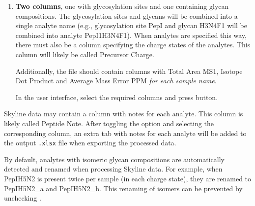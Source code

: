 \begin{enumerate}[topsep=0pt, itemsep=0pt]
	\item 
	\textbf{Two columns}, one with glycosylation sites and one containing glycan compositions.
	The glycosylation sites and glycans will be combined into a single analyte name (e.g., glycosylation site \textsf{PepI} and glycan \textsf{H3N4F1} will be combined into analyte \textsf{PepI1H3N4F1}).
	When analytes are specified this way, there must also be a column specifying the charge states of the analytes.
	This column will likely be called \textsf{Precursor Charge}.
	
	Additionally, the file should contain columns with \textsf{Total Area MS1}, \textsf{Isotope Dot Product} and \textsf{Average Mass Error PPM} \emph{for each sample name}.
	
	In the user interface, select the required columns and press  button.
		
\end{enumerate}


\begin{optionalbox}
	Skyline data may contain a column with notes for each analyte. 
	This column is likely called \textsf{Peptide Note}.
	After toggling the option  and selecting the corresponding column, an extra tab with notes for each analyte will be added to the output \texttt{.xlsx} file when exporting the processed data.
\end{optionalbox}

By default, analytes with isomeric glycan compositions are automatically detected and renamed when processing Skyline data.
For example, when \textsf{PepIH5N2} is present twice per sample (in each charge state), they are renamed to \textsf{PepIH5N2\_a} and \textsf{PepIH5N2\_b}. 
This renaming of isomers can be prevented by unchecking .

